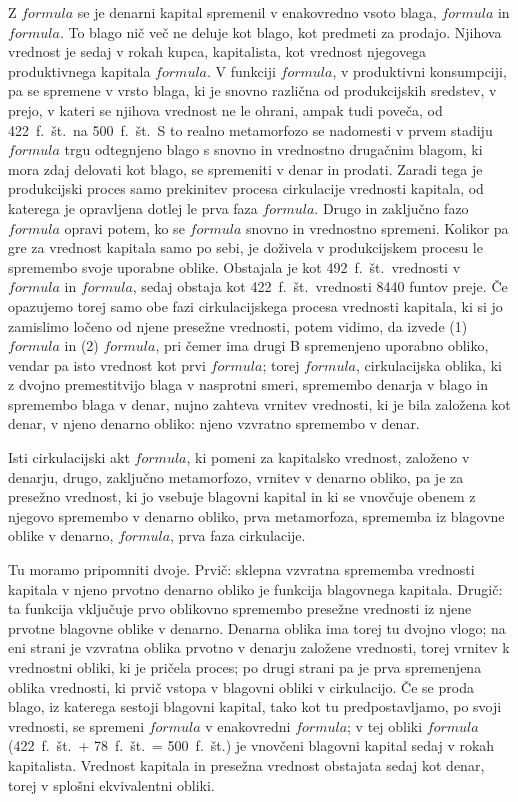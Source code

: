 \documentclass[a5paper]{scrbook}
\begin{document}
Z \( formula \) se je denarni kapital spremenil v enakovredno vsoto blaga, \( formula \) in \( formula \). To blago nič več ne deluje kot blago, kot predmeti za prodajo. Njihova vrednost je sedaj v rokah kupca, kapitalista, kot vrednost njegovega produktivnega kapitala \( formula \). V funkciji \( formula \), v produktivni konsumpciji, pa se spremene v vrsto blaga, ki je snovno različna od produkcijskih sredstev, v prejo, v kateri se njihova vrednost ne le ohrani, ampak tudi poveča, od 422~f.~št.\ na 500~f.~št.\ S to realno metamorfozo se nadomesti v prvem stadiju \( formula \) trgu odtegnjeno blago s snovno in vrednostno drugačnim blagom, ki mora zdaj delovati kot blago, se spremeniti v denar in prodati. Zaradi tega je produkcijski proces samo prekinitev procesa cirkulacije vrednosti kapitala, od katerega je opravljena dotlej le prva faza \( formula \). Drugo in zaključno fazo \( formula \) opravi potem, ko se \( formula \) snovno in vrednostno spremeni. Kolikor pa gre za vrednost kapitala samo po sebi, je doživela v produkcijskem procesu le spremembo svoje uporabne oblike. Obstajala je kot 492~f.~št.\ vrednosti v \( formula \) in \( formula \), sedaj obstaja kot 422~f.~št.\ vrednosti 8440 funtov preje. Če opazujemo torej samo obe fazi cirkulacijskega procesa vrednosti kapitala, ki si jo zamislimo ločeno od njene presežne vrednosti, potem vidimo, da izvede (1) \( formula \) in (2) \( formula \), pri čemer ima drugi B spremenjeno uporabno obliko, vendar pa isto vrednost kot prvi \( formula \); torej \( formula \), cirkulacijska oblika, ki z dvojno premestitvijo blaga v nasprotni smeri, spremembo denarja v blago in spremembo blaga v denar, nujno zahteva vrnitev vrednosti, ki je bila založena kot denar, v njeno denarno obliko: njeno vzvratno spremembo v denar.

Isti cirkulacijski akt \( formula \), ki pomeni za kapitalsko vrednost, založeno v denarju, drugo, zaključno metamorfozo, vrnitev v denarno obliko, pa je za presežno vrednost, ki jo vsebuje blagovni kapital in ki se vnovčuje obenem z njegovo spremembo v denarno obliko, prva metamorfoza, sprememba iz blagovne oblike v denarno, \( formula \), prva faza cirkulacije.

Tu moramo pripomniti dvoje. Prvič: sklepna vzvratna sprememba vrednosti kapitala v njeno prvotno denarno obliko je funkcija blagovnega kapitala. Drugič: ta funkcija vključuje prvo oblikovno spremembo presežne vrednosti iz njene prvotne blagovne oblike v denarno. Denarna oblika ima torej tu dvojno vlogo; na eni strani je vzvratna oblika prvotno v denarju založene vrednosti, torej vrnitev k vrednostni obliki, ki je pričela proces; po drugi strani pa je prva spremenjena oblika vrednosti, ki prvič vstopa v blagovni obliki v cirkulacijo. Če se proda blago, iz katerega sestoji blagovni kapital, tako kot tu predpostavljamo, po svoji vrednosti, se spremeni \( formula \) v enakovredni \( formula \); v tej obliki \( formula \) (422~f.~št.\ + 78~f.~št.\ = 500~f.~št.) je vnovčeni blagovni kapital sedaj v rokah kapitalista. Vrednost kapitala in presežna vrednost obstajata sedaj kot denar, torej v splošni ekvivalentni obliki.
\end{document}
